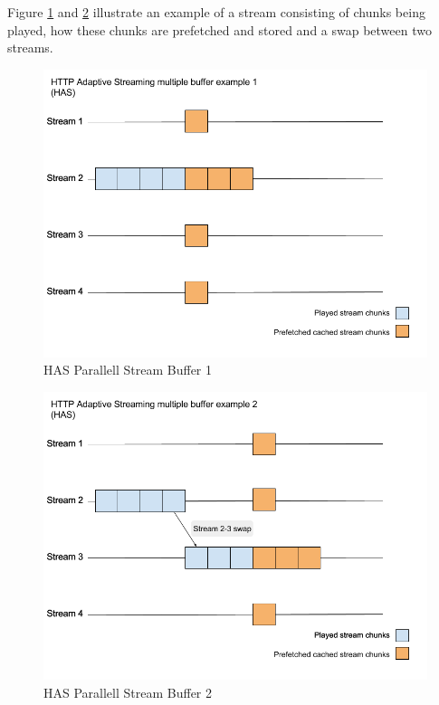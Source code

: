 \documentclass[9pt,a4paper]{acmproc}
\begin{document}
Figure \ref{fig:HAS1} and \ref{fig:HAS2} illustrate an example of a stream consisting of chunks being played, how these chunks are prefetched and stored and a swap between two streams.

\begin{figure}[!ht]
\begin{center}
\includegraphics[scale=0.3]{HAS1.png}
\caption{HAS Parallell Stream Buffer 1}
\label{fig:HAS1}
\end{center}
\end{figure}

\begin{figure}[!ht]
\begin{center}
\includegraphics[scale=0.3]{HAS2.png}
\caption{HAS Parallell Stream Buffer 2}
\label{fig:HAS2}
\end{center}
\end{figure}
\end{document}
